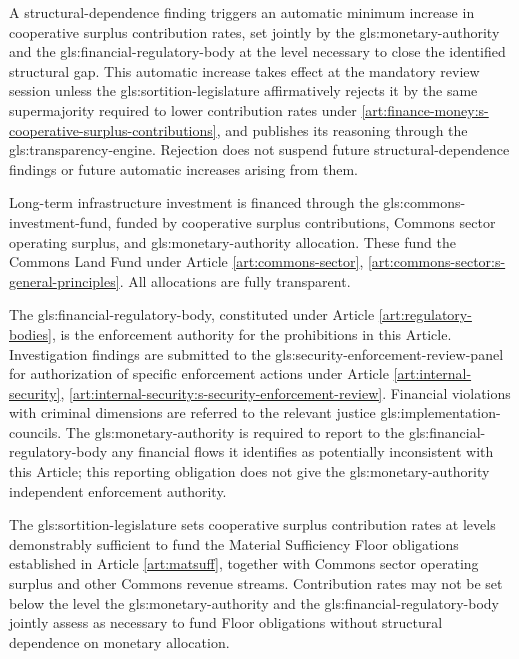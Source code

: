 A structural-dependence finding triggers an automatic minimum increase in cooperative surplus contribution rates, set jointly by the \gls{gls:monetary-authority} and the \gls{gls:financial-regulatory-body} at the level necessary to close the identified structural gap. This automatic increase takes effect at the mandatory review session unless the \gls{gls:sortition-legislature} affirmatively rejects it by the same supermajority required to lower contribution rates under \ref{art:finance-money:s-cooperative-surplus-contributions}, and publishes its reasoning through the \gls{gls:transparency-engine}. Rejection does not suspend future structural-dependence findings or future automatic increases arising from them.

Long-term infrastructure investment is financed through the \gls{gls:commons-investment-fund}, funded by cooperative surplus contributions, Commons sector operating surplus, and \gls{gls:monetary-authority} allocation. These fund the Commons Land Fund under Article \ref{art:commons-sector}, \ref{art:commons-sector:s-general-principles}. All allocations are fully transparent.

The \gls{gls:financial-regulatory-body}, constituted under Article \ref{art:regulatory-bodies}, is the enforcement authority for the prohibitions in this Article. Investigation findings are submitted to the \gls{gls:security-enforcement-review-panel} for authorization of specific enforcement actions under Article \ref{art:internal-security}, \ref{art:internal-security:s-security-enforcement-review}. Financial violations with criminal dimensions are referred to the relevant justice \gls{gls:implementation-councils}. The \gls{gls:monetary-authority} is required to report to the \gls{gls:financial-regulatory-body} any financial flows it identifies as potentially inconsistent with this Article; this reporting obligation does not give the \gls{gls:monetary-authority} independent enforcement authority.

The \gls{gls:sortition-legislature} sets cooperative surplus contribution rates at levels demonstrably sufficient to fund the Material Sufficiency Floor obligations established in Article \ref{art:matsuff}, together with Commons sector operating surplus and other Commons revenue streams. Contribution rates may not be set below the level the \gls{gls:monetary-authority} and the \gls{gls:financial-regulatory-body} jointly assess as necessary to fund Floor obligations without structural dependence on monetary allocation.

